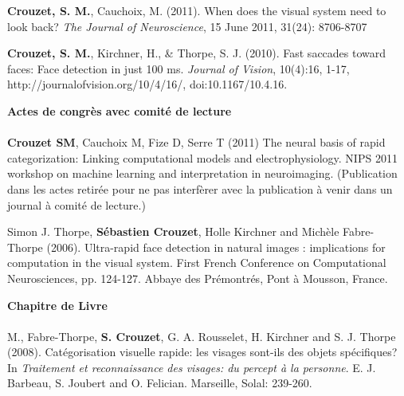 \documentclass[margin,line]{resume}
\begin{document}
\begin{resume}
	\vspace{-2mm} \textbf{Crouzet, S. M.}, Cauchoix, M. (2011). When does the visual system need to look back?  \textit{The Journal of Neuroscience}, 15 June 2011, 31(24): 8706-8707

	\vspace{-2mm} \textbf{Crouzet, S. M.}, Kirchner, H., \& Thorpe, S. J.  (2010). Fast saccades toward faces: Face detection in just 100 ms. \textit{Journal of Vision}, 10(4):16, 1-17, http://journalofvision.org/10/4/16/, doi:10.1167/10.4.16.


%
%	

\vspace{3mm}	
\textbf{Actes de congrès avec comité de lecture}\\\\
  \textbf{Crouzet SM}, Cauchoix M, Fize D, Serre T (2011) The neural basis of rapid categorization: Linking computational models and electrophysiology. NIPS 2011 workshop on machine learning and interpretation in neuroimaging. (Publication dans les actes retirée pour ne pas interfèrer avec la publication à venir dans un journal à comité de lecture.)

	\vspace{-2mm} Simon J. Thorpe, \textbf{Sébastien Crouzet}, Holle Kirchner and Michèle Fabre-Thorpe (2006). Ultra-rapid face detection in natural images : implications for computation in the visual system. First French Conference on Computational Neurosciences, pp. 124-127. Abbaye des Prémontrés, Pont à Mousson, France.


\vspace{3mm}	
\textbf{Chapitre de Livre}\\\\
	M., Fabre-Thorpe, \textbf{S. Crouzet}, G. A. Rousselet, H. Kirchner and S. J. Thorpe (2008). Catégorisation visuelle rapide: les visages sont-ils des 	objets spécifiques? In \textsl{Traitement et reconnaissance des visages: du percept à la personne}. E. J. Barbeau, S. Joubert and O. Felician. Marseille, Solal: 239-260.



\end{resume}
\end{document}
